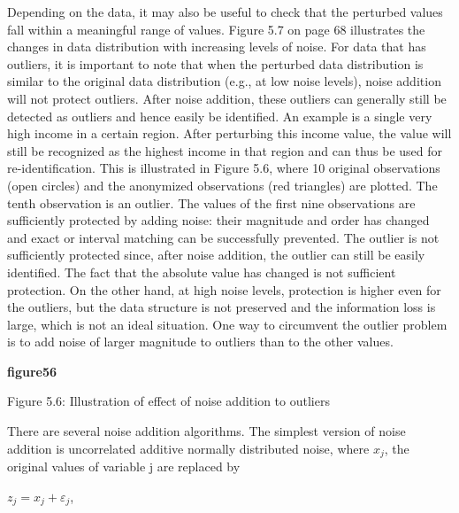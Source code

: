 \documentclass[letterpaper,10pt,english]{sphinxmanual}
\begin{document}
Depending on the data, it may also be useful to check that the perturbed
values fall within a meaningful range of values. Figure 5.7 on page 68
illustrates the changes in data distribution with increasing levels of
noise. For data that has outliers, it is important to note that when the
perturbed data distribution is similar to the original data distribution
(e.g., at low noise levels), noise addition will not protect outliers.
After noise addition, these outliers can generally still be detected as
outliers and hence easily be identified. An example is a single very
high income in a certain region. After perturbing this income value, the
value will still be recognized as the highest income in that region and
can thus be used for re-identification. This is illustrated in Figure
5.6, where 10 original observations (open circles) and the anonymized
observations (red triangles) are plotted. The tenth observation is an
outlier. The values of the first nine observations are sufficiently
protected by adding noise: their magnitude and order has changed and
exact or interval matching can be successfully prevented. The outlier is
not sufficiently protected since, after noise addition, the outlier can
still be easily identified. The fact that the absolute value has changed
is not sufficient protection. On the other hand, at high noise levels,
protection is higher even for the outliers, but the data structure is
not preserved and the information loss is large, which is not an ideal
situation. One way to circumvent the outlier problem is to add noise of
larger magnitude to outliers than to the other values.

{\color{red}\bfseries{}\textbar{}figure56\textbar{}}

Figure 5.6: Illustration of effect of noise addition to outliers

There are several noise addition algorithms. The simplest version of
noise addition is uncorrelated additive normally distributed noise,
where \(x_{j}\), the original values of variable
\(\text{j\ }\)are replaced by

\(z_{j} = x_{j} + \varepsilon_{j}\),
\end{document}
